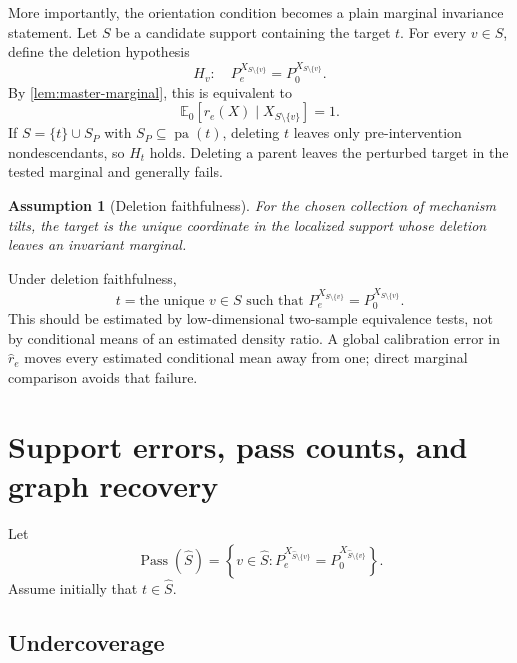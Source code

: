 \documentclass[11pt]{article}
\newtheorem{assumption}[theorem]{Assumption}
\newcommand{\E}{\mathbb{E}}
\newcommand{\pa}{\operatorname{pa}}
\begin{document}
More importantly, the orientation condition becomes a plain marginal invariance statement.  Let \(S\) be a candidate support containing the target \(t\).  For every \(v\in S\), define the deletion hypothesis
\begin{equation}
H_v:\quad P_e^{X_{S\setminus\{v\}}}=P_0^{X_{S\setminus\{v\}}}.
\label{eq:deletion-null}
\end{equation}
By \cref{lem:master-marginal}, this is equivalent to
\begin{equation}
\E_0[r_e(X)\mid X_{S\setminus\{v\}}]=1.
\end{equation}
If \(S=\{t\}\cup S_P\) with \(S_P\subseteq\pa(t)\), deleting \(t\) leaves only pre-intervention nondescendants, so \(H_t\) holds.  Deleting a parent leaves the perturbed target in the tested marginal and generally fails.

\begin{assumption}[Deletion faithfulness]
For the chosen collection of mechanism tilts, the target is the unique coordinate in the localized support whose deletion leaves an invariant marginal.
\end{assumption}

Under deletion faithfulness,
\begin{equation}
\boxed{
t=\text{the unique }v\in S\text{ such that }P_e^{X_{S\setminus\{v\}}}=P_0^{X_{S\setminus\{v\}}}.
}
\end{equation}
This should be estimated by low-dimensional two-sample equivalence tests, not by conditional means of an estimated density ratio.  A global calibration error in \(\widehat r_e\) moves every estimated conditional mean away from one; direct marginal comparison avoids that failure.

\section{Support errors, pass counts, and graph recovery}

Let
\begin{equation}
\operatorname{Pass}(\widehat S)
=
\left\{v\in\widehat S:
P_e^{X_{\widehat S\setminus\{v\}}}=P_0^{X_{\widehat S\setminus\{v\}}}
\right\}.
\end{equation}
Assume initially that \(t\in\widehat S\).

\subsection{Undercoverage}
\end{document}
